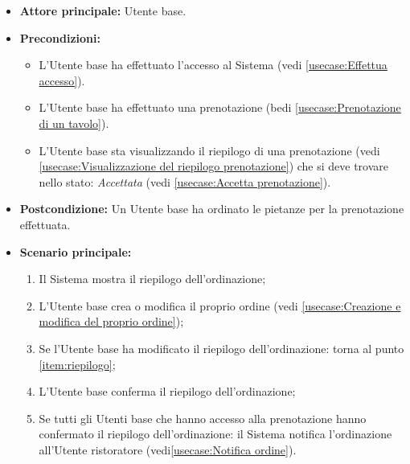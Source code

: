 \label{usecase:Ordinazione collaborativa dei pasti}
\begin{itemize}
	\item \textbf{Attore principale:} Utente base.

	\item \textbf{Precondizioni:}
		\begin{itemize}
			\item L'Utente base ha effettuato l'accesso al Sistema (vedi \autoref{usecase:Effettua accesso}).
			\item L'Utente base ha effettuato una prenotazione (bedi \autoref{usecase:Prenotazione di un tavolo}).
			\item L'Utente base sta visualizzando il riepilogo di una prenotazione (vedi \autoref{usecase:Visualizzazione del riepilogo prenotazione}) che si deve trovare nello stato: \textit{Accettata}  (vedi \autoref{usecase:Accetta prenotazione}).
		\end{itemize}
	      
	\item \textbf{Postcondizione:} Un Utente base ha ordinato le pietanze per la prenotazione effettuata.

	\item \textbf{Scenario principale:}
	      \begin{enumerate}
		      \item \label{item:riepilogo}
		            Il Sistema mostra il riepilogo dell'ordinazione;

		      \item L'Utente base crea o modifica il proprio ordine
		            (vedi \autoref{usecase:Creazione e modifica del proprio ordine});

		      \item Se l'Utente base ha modificato il riepilogo dell'ordinazione: torna al punto \ref{item:riepilogo};

		      \item L'Utente base conferma il riepilogo dell'ordinazione;

		      \item Se tutti gli Utenti base che hanno accesso alla prenotazione
		            hanno confermato il riepilogo dell'ordinazione: il Sistema
		            notifica l'ordinazione all'Utente ristoratore (vedi\autoref{usecase:Notifica ordine}).
	      \end{enumerate}


\end{itemize}
